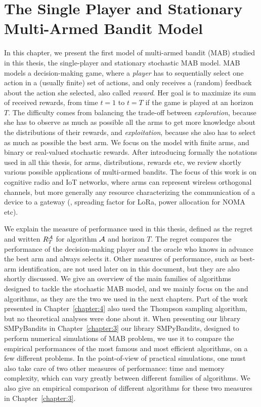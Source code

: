 
\chapter{The Single Player and Stationary Multi-Armed Bandit Model}
\label{chapter:2}
\minitoc

In this chapter, we present the first model of multi-armed bandit (MAB) studied in this thesis,
the single-player and stationary stochastic MAB model.
MAB models a decision-making game, where a \emph{player} has to sequentially select one action in a (usually finite) set of actions, and only receives a (random) feedback about the action she selected, also called \emph{reward}.
Her goal is to maximize its sum of received rewards, from time $t=1$ to $t=T$ if the game is played at an horizon $T$. The difficulty comes from balancing the trade-off between \emph{exploration}, because she has to observe as much as possible all the arms to get more knowledge about the distributions of their rewards, and \emph{exploitation}, because she also has to select as much as possible the best arm.
%
We focus on the model with finite arms, and binary or real-valued stochastic rewards.
After introducing formally the notations used in all this thesis, for arms, distributions, rewards etc, we review shortly various possible applications of multi-armed bandits.
The focus of this work is on cognitive radio and IoT networks, where arms can represent wireless orthogonal channels, but more generally any resource characterizing the communication of a device to a gateway (\eg, spreading factor for LoRa, power allocation for NOMA etc).

We explain the measure of performance used in this thesis, defined as the regret and written $R_T^{\mathcal{A}}$ for algorithm $\mathcal{A}$ and horizon $T$. The regret compares the performance of the decision-making player and the oracle who knows in advance the best arm and always selects it.
Other measures of performance, such as best-arm identification, are not used later on in this document, but they are also shortly discussed.
%
We give an overview of the main families of algorithms designed to tackle the stochastic MAB model, and we mainly focus on the \UCB{} and \klUCB{} algorithms, as they are the two we used in the next chapters.
Part of the work presented in Chapter~\ref{chapter:4} also used the Thompson sampling algorithm, but no theoretical analyses were done about it.
When presenting our library SMPyBandits in Chapter~\ref{chapter:3} our library SMPyBandits, designed to perform numerical simulations of MAB problem, we use it to compare the empirical performances of the most famous and most efficient algorithms, on a few different problems.
%
In the point-of-view of practical simulations, one must also take care of two other measures of performance: time and memory complexity, which can vary greatly between different families of algorithms.
We also give an empirical comparison of different algorithms for these two measures in Chapter~\ref{chapter:3}.

